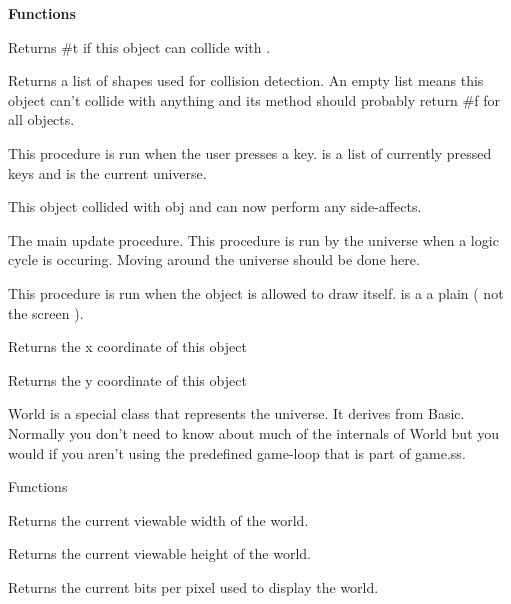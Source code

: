 {\bf Functions}


Returns #t if this object can collide with .


Returns a list of shapes used for collision detection. An empty list means this object can't collide with anything and its  method should probably return #f for all objects.


This procedure is run when the user presses a key.  is a list of currently pressed keys and  is the current universe.


This object collided with obj and can now perform any side-affects.


The main update procedure. This procedure is run by the universe when a logic cycle is occuring. Moving around the universe should be done here.


This procedure is run when the object is allowed to draw itself.  is a  a plain ( not the screen ).


Returns the x coordinate of this object


Returns the y coordinate of this object


World is a special class that represents the universe. It derives from Basic. Normally you don't need to know about much of the internals of World but you would if you aren't using the predefined game-loop that is part of game.ss.

Functions


Returns the current viewable width of the world.


Returns the current viewable height of the world.


Returns the current bits per pixel used to display the world.

